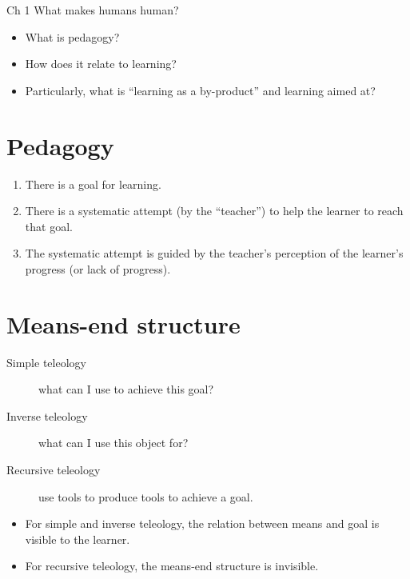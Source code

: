 \begin{frame}
  \begin{block}{Ch 1 What makes humans human?}
    \begin{itemize}
      \item What is pedagogy?
      \item How does it relate to learning?
      \item Particularly, what is \enquote{learning as a by-product} and 
        {learning aimed at}?
    \end{itemize}
  \end{block}
\end{frame}

\section{Pedagogy}

\begin{frame}
  \begin{definition}
    \begin{enumerate}
      \item There is a goal for learning.
      \item There is a systematic attempt (by the \enquote{teacher}) to help 
        the learner to reach that goal.
      \item The systematic attempt is guided by the teacher's perception of the 
        learner's progress (or lack of progress).
    \end{enumerate}
  \end{definition}
\end{frame}

\section{Means-end structure}

\begin{frame}
  \begin{definition}[Teleology]
    \begin{description}
      \item[Simple teleology] what can I use to achieve this goal?
      \item[Inverse teleology] what can I use this object for?
      \item[Recursive teleology] use tools to produce tools to achieve a goal.
    \end{description}
  \end{definition}

  \pause

  \begin{remark}
    \begin{itemize}
      \item For simple and inverse teleology, the relation between means and 
        goal is visible to the learner.
      \item For recursive teleology, the means-end structure is invisible.
    \end{itemize}
  \end{remark}
\end{frame}

